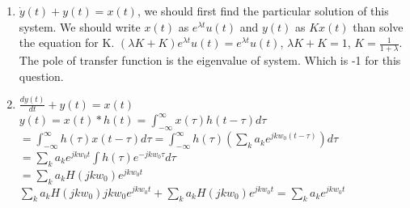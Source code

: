 \documentclass[10pt,a4paper, margin=1in]{article}
\begin{document}
\begin{enumerate}
\begin{enumerate}

    
    
    \item $\dot{y}(t) + y(t) = x(t)$, we should first find the particular solution of this system. We should write $x(t)$ as $e^{\lambda t}u(t)$ and $y(t)$ as $Kx(t)$ than solve the equation for K. $(\lambda K  + K)e^{\lambda t}u(t) = e^{\lambda t} u(t)$, $\lambda K + K = 1$, $K = \frac{1}{1+\lambda}$. The pole of transfer function is the eigenvalue of system. Which is -1 for this question.
	\item %
	$\frac{dy(t)}{dt} + y(t) = x(t)$ \\

    $y(t) = x(t) * h(t) = \int_{-\infty}^{\infty}x(\tau)h(t-\tau)d\tau$ \\

    $=\int_{-\infty}^{\infty}h(\tau)x(t-\tau)d\tau = \int_{-\infty}^{\infty}h(\tau)(\sum_{k}a_k e^{jkw_0 (t-\tau)}) d\tau$ \\

    $=\sum_{k}a_k e^{jkw_0 t}\int h(\tau)e^{-jkw_0 \tau} d\tau$ \\

    $=\sum_{k}a_k H(jkw_0)e^{jkw_0 t}$ \\

    $\sum_{k}a_k H(jkw_0)jkw_0 e^{jkw_0 t} + \sum_{k}a_k H(jkw_0) e^{jkw_0 t} = \sum_{k}a_k e^{jkw_0 t} $ \\


\end{enumerate}
\end{enumerate}
\end{document}

